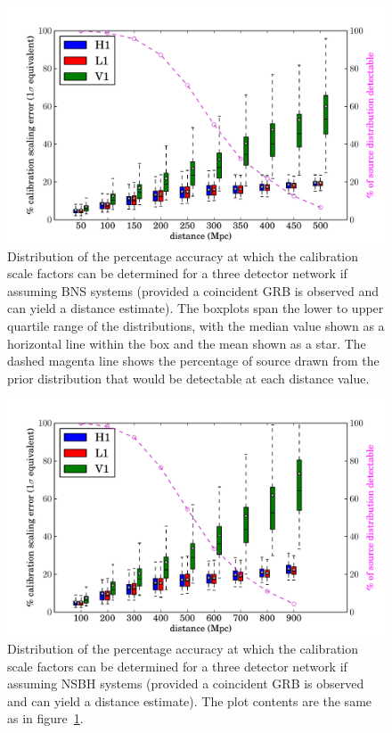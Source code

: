\documentclass[10pt]{iopart}
\begin{document}
\begin{figure}
 \begin{center}
  \includegraphics[width=1.0\textwidth]{scale_factor.pdf}
 \end{center}
 \caption{\label{fig:bnsresults} Distribution of the percentage accuracy at which the calibration 
scale factors can be determined for a three detector network if assuming \ac{BNS} systems (provided 
a coincident GRB is observed and can yield a distance estimate). The boxplots span the lower to 
upper quartile range of the distributions, with the median value shown as a horizontal line within 
the box and the mean shown as a star. The dashed magenta line shows the percentage of source drawn 
from the prior distribution that would be detectable at each distance value.}
\end{figure}

\begin{figure}
 \begin{center}
  \includegraphics[width=1.0\textwidth]{scale_factor_nsbh.pdf}
 \end{center}
 \caption{\label{fig:nsbhresults} Distribution of the percentage accuracy at which the calibration 
scale factors can be determined for a three detector network if assuming \ac{NSBH} systems 
(provided a coincident GRB is observed and can yield a distance estimate). The plot contents are 
the same as 
in figure~\ref{fig:bnsresults}.}
\end{figure}
\end{document}
